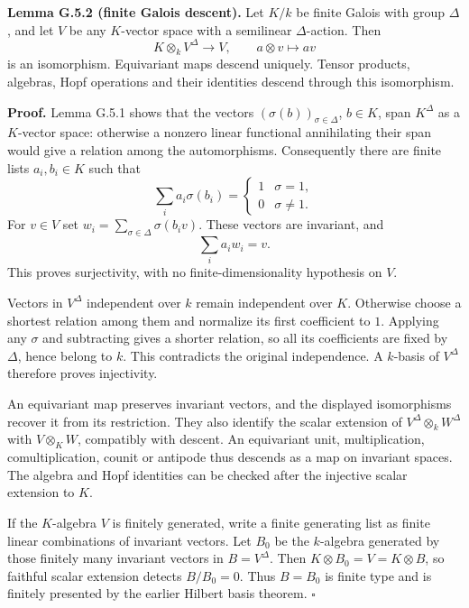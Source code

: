 \documentclass[11pt,a4paper,openany]{report}
\begin{document}
\textbf{Lemma G.5.2 (finite Galois descent).} Let \(K/k\) be finite Galois with group \(\Delta\), and let \(V\) be any \(K\)-vector space with a semilinear \(\Delta\)-action. Then \[
K\otimes_kV^\Delta\longrightarrow V,\qquad a\otimes v\longmapsto av
\] is an isomorphism. Equivariant maps descend uniquely. Tensor products, algebras, Hopf operations and their identities descend through this isomorphism.

\textbf{Proof.} Lemma G.5.1 shows that the vectors \((\sigma(b))_{\sigma\in\Delta}\), \(b\in K\), span \(K^\Delta\) as a \(K\)-vector space: otherwise a nonzero linear functional annihilating their span would give a relation among the automorphisms. Consequently there are finite lists \(a_i,b_i\in K\) such that \[
\sum_i a_i\sigma(b_i)=
\begin{cases}1&\sigma=1,\\0&\sigma\ne1.\end{cases}
\] For \(v\in V\) set \(w_i=\sum_{\sigma\in\Delta}\sigma(b_iv)\). These vectors are invariant, and \[
\sum_i a_iw_i=v.
\] This proves surjectivity, with no finite-dimensionality hypothesis on \(V\).

Vectors in \(V^\Delta\) independent over \(k\) remain independent over \(K\). Otherwise choose a shortest relation among them and normalize its first coefficient to \(1\). Applying any \(\sigma\) and subtracting gives a shorter relation, so all its coefficients are fixed by \(\Delta\), hence belong to \(k\). This contradicts the original independence. A \(k\)-basis of \(V^\Delta\) therefore proves injectivity.

An equivariant map preserves invariant vectors, and the displayed isomorphisms recover it from its restriction. They also identify the scalar extension of \(V^\Delta\otimes_kW^\Delta\) with \(V\otimes_KW\), compatibly with descent. An equivariant unit, multiplication, comultiplication, counit or antipode thus descends as a map on invariant spaces. The algebra and Hopf identities can be checked after the injective scalar extension to \(K\).

If the \(K\)-algebra \(V\) is finitely generated, write a finite generating list as finite linear combinations of invariant vectors. Let \(B_0\) be the \(k\)-algebra generated by those finitely many invariant vectors in \(B=V^\Delta\). Then \(K\otimes B_0=V=K\otimes B\), so faithful scalar extension detects \(B/B_0=0\). Thus \(B=B_0\) is finite type and is finitely presented by the earlier Hilbert basis theorem. \(\square\)
\end{document}
